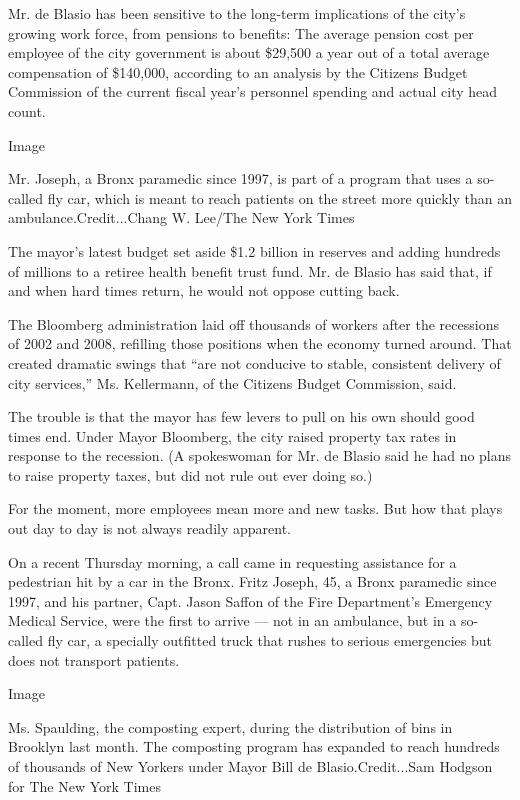 Mr. de Blasio has been sensitive to the long-term implications of the
city's growing work force, from pensions to benefits: The average
pension cost per employee of the city government is about \$29,500 a
year out of a total average compensation of \$140,000, according to an
analysis by the Citizens Budget Commission of the current fiscal year's
personnel spending and actual city head count.

Image

Mr. Joseph, a Bronx paramedic since 1997, is part of a program that uses
a so-called fly car, which is meant to reach patients on the street more
quickly than an ambulance.Credit...Chang W. Lee/The New York Times

The mayor's latest budget set aside \$1.2 billion in reserves and adding
hundreds of millions to a retiree health benefit trust fund. Mr. de
Blasio has said that, if and when hard times return, he would not oppose
cutting back.

The Bloomberg administration laid off thousands of workers after the
recessions of 2002 and 2008, refilling those positions when the economy
turned around. That created dramatic swings that ``are not conducive to
stable, consistent delivery of city services,'' Ms. Kellermann, of the
Citizens Budget Commission, said.

The trouble is that the mayor has few levers to pull on his own should
good times end. Under Mayor Bloomberg, the city raised property tax
rates in response to the recession. (A spokeswoman for Mr. de Blasio
said he had no plans to raise property taxes, but did not rule out ever
doing so.)

For the moment, more employees mean more and new tasks. But how that
plays out day to day is not always readily apparent.

On a recent Thursday morning, a call came in requesting assistance for a
pedestrian hit by a car in the Bronx. Fritz Joseph, 45, a Bronx
paramedic since 1997, and his partner, Capt. Jason Saffon of the Fire
Department's Emergency Medical Service, were the first to arrive --- not
in an ambulance, but in a so-called fly car, a specially outfitted truck
that rushes to serious emergencies but does not transport patients.

Image

Ms. Spaulding, the composting expert, during the distribution of bins in
Brooklyn last month. The composting program has expanded to reach
hundreds of thousands of New Yorkers under Mayor Bill de
Blasio.Credit...Sam Hodgson for The New York Times

